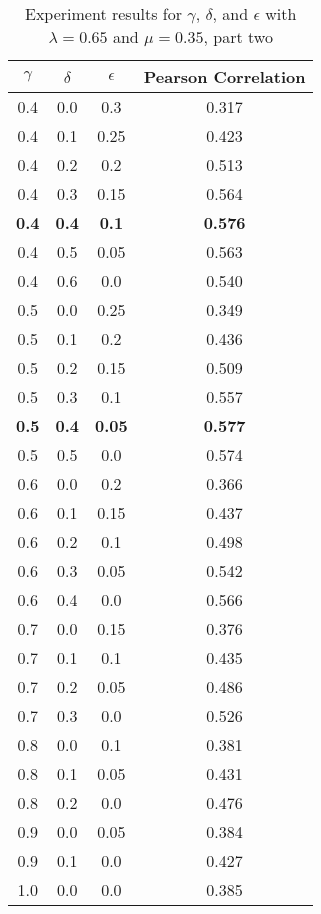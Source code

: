\documentclass{article}
\begin{document}
\begin{table}[h!]
\centering
\begin{tabular}{|c|c|c||c|}
	\hline
	$\gamma$ & $\delta$ & $\epsilon$ & Pearson Correlation \\
	\hline
	0.4 & 0.0 & 0.3 & 0.317 \\
	0.4 & 0.1 & 0.25 & 0.423 \\
	0.4 & 0.2 & 0.2 & 0.513 \\
	0.4 & 0.3 & 0.15 & 0.564 \\
	\textbf{0.4} & \textbf{0.4} & \textbf{0.1} & \textbf{0.576} \\
	0.4 & 0.5 & 0.05 & 0.563 \\
	0.4 & 0.6 & 0.0 & 0.540 \\
	\hline
	0.5 & 0.0 & 0.25 & 0.349 \\
	0.5 & 0.1 & 0.2 & 0.436 \\
	0.5 & 0.2 & 0.15 & 0.509 \\
	0.5 & 0.3 & 0.1 & 0.557 \\
	\textbf{0.5} & \textbf{0.4} & \textbf{0.05} & \textbf{0.577} \\
	0.5 & 0.5 & 0.0 & 0.574 \\
	\hline
	0.6 & 0.0 & 0.2 & 0.366 \\
	0.6 & 0.1 & 0.15 & 0.437 \\
	0.6 & 0.2 & 0.1 & 0.498 \\
	0.6 & 0.3 & 0.05 & 0.542 \\
	0.6 & 0.4 & 0.0 & 0.566 \\
	\hline
	0.7 & 0.0 & 0.15 & 0.376 \\
	0.7 & 0.1 & 0.1 & 0.435 \\
	0.7 & 0.2 & 0.05 & 0.486 \\
	0.7 & 0.3 & 0.0 & 0.526 \\
	\hline
	0.8 & 0.0 & 0.1 & 0.381 \\
	0.8 & 0.1 & 0.05 & 0.431 \\
	0.8 & 0.2 & 0.0 & 0.476 \\
	\hline
	0.9 & 0.0 & 0.05 & 0.384 \\
	0.9 & 0.1 & 0.0 & 0.427 \\
	\hline
	1.0 & 0.0 & 0.0 & 0.385 \\
	\hline
\end{tabular}
\caption{Experiment results for $\gamma$, $\delta$, and $\epsilon$ with $\lambda = 0.65$ and $\mu = 0.35$, part two}
\label{table:gammaresults2}
\end{table}
\end{document}
